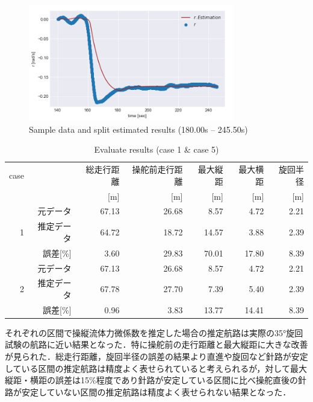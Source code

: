 \begin{figure}[htbp]
    \centering   
    \includegraphics[width=0.8\textwidth]{img/appendix2/5-7.png}
    \caption{Sample data and split estimated results (180.00s – 245.50s)}
    \label{fig:5-7_png}
\end{figure}

\begin{table}[htbp]
 \caption{Evaluate results (case 1 \& case 5)}
 \label{tb:5-4}
 \centering
  \begin{tabular}{rrrrrrr}
    \toprule
    case & & 総走行距離 & 操舵前走行距離 & 最大縦距 & 最大横距 & 旋回半径 \\
    & & [m] & [m] & [m] & [m] & [m] \\
    \midrule
    \multirow{3}{*}{1} & 元データ & 67.13 & 26.68 & 8.57 & 4.72 & 2.21 \\
         & 推定データ        & 64.72 & 18.72 & 14.57 & 3.88 & 2.39 \\
         & 誤差[\%]        & 3.60 & 29.83 & 70.01 & 17.80 & 8.39 \\
    \midrule
    \multirow{3}{*}{2} & 元データ & 67.13 & 26.68 & 8.57 & 4.72 & 2.21 \\
         & 推定データ        & 67.78 & 27.70 & 7.39 & 5.40 & 2.39 \\
         & 誤差[\%]        & 0.96 & 3.83 & 13.77 & 14.41 & 8.39 \\
    \bottomrule
  \end{tabular}
\end{table}

それぞれの区間で操縦流体力微係数を推定した場合の推定航路は実際の35°旋回試験の航路に近い結果となった．特に操舵前の走行距離と最大縦距に大きな改善が見られた．総走行距離，旋回半径の誤差の結果より直進や旋回など針路が安定している区間の推定航路は精度よく表せられていると考えられるが，対して最大縦距・横距の誤差は15\%程度であり針路が安定している区間に比べ操舵直後の針路が安定していない区間の推定航路は精度よく表せられない結果となった．

